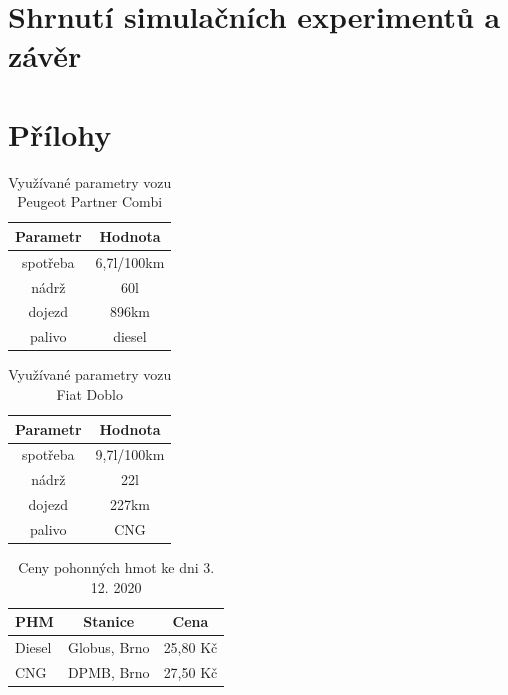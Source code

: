 \documentclass[a4paper, 11pt]{article}
\begin{document}
\section{Shrnutí simulačních experimentů a závěr}


\section*{Přílohy}
\begin{table}[h]
\centering
\begin{tabular}{cc}
\textbf{Parametr} & \textbf{Hodnota}                                                                                   \\ \hline
spotřeba & 6,7l/100km \\ \hline
nádrž  & 60l \\ \hline                      
dojezd &  896km \\ \hline
palivo & diesel
\end{tabular}
\caption{Využívané parametry vozu Peugeot Partner Combi}
\label{tab:1}
\end{table}

\begin{table}[h]
\centering
\begin{tabular}{cc}
\textbf{Parametr} & \textbf{Hodnota}                                                                                   \\ \hline
spotřeba & 9,7l/100km \\ \hline
nádrž  & 22l \\ \hline
dojezd &  227km \\ \hline
palivo & CNG
\end{tabular}
\caption{Využívané parametry vozu Fiat Doblo}
\label{tab:2}
\end{table}

\begin{table}[h]
\centering
\begin{tabular}{lcc}
\textbf{PHM} & \textbf{Stanice} & \textbf{Cena}                                                                                   \\ \hline
Diesel & Globus, Brno & 25,80 Kč \\ \hline
CNG & DPMB, Brno & 27,50 Kč
\end{tabular}
\caption{Ceny pohonných hmot ke dni 3. 12. 2020}
\label{tab:3}
\end{table}


 

\end{document}
